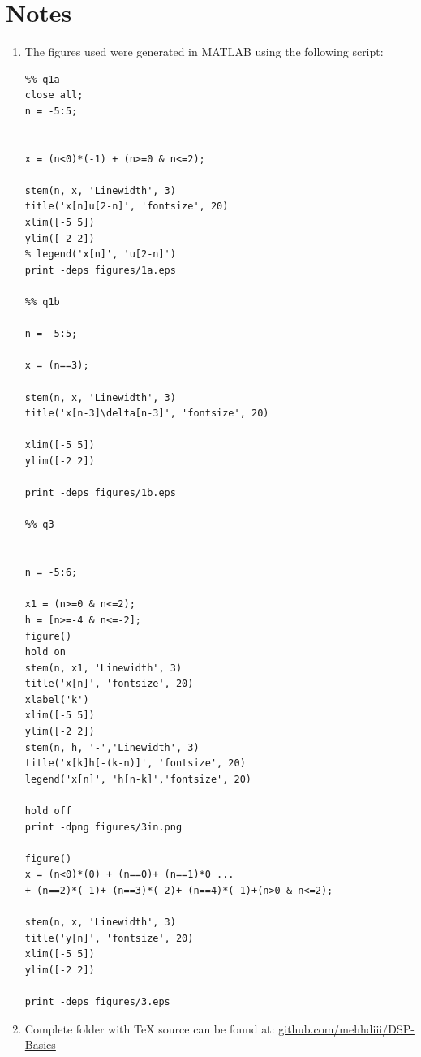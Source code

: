 \documentclass[12pt,letterpaper]{article}
\begin{document}
\section*{Notes}
\begin{enumerate}
    \item The figures used were generated in MATLAB using the following script: 
\begin{lstlisting}
%% q1a
close all; 
n = -5:5;


x = (n<0)*(-1) + (n>=0 & n<=2);

stem(n, x, 'Linewidth', 3)
title('x[n]u[2-n]', 'fontsize', 20)
xlim([-5 5])
ylim([-2 2])
% legend('x[n]', 'u[2-n]')
print -deps figures/1a.eps

%% q1b

n = -5:5;

x = (n==3);

stem(n, x, 'Linewidth', 3)
title('x[n-3]\delta[n-3]', 'fontsize', 20)

xlim([-5 5])
ylim([-2 2])

print -deps figures/1b.eps

%% q3


n = -5:6;

x1 = (n>=0 & n<=2);
h = [n>=-4 & n<=-2]; 
figure()
hold on 
stem(n, x1, 'Linewidth', 3)
title('x[n]', 'fontsize', 20)
xlabel('k')
xlim([-5 5])
ylim([-2 2])
stem(n, h, '-','Linewidth', 3)
title('x[k]h[-(k-n)]', 'fontsize', 20)
legend('x[n]', 'h[n-k]','fontsize', 20)

hold off
print -dpng figures/3in.png

figure()
x = (n<0)*(0) + (n==0)+ (n==1)*0 ...
+ (n==2)*(-1)+ (n==3)*(-2)+ (n==4)*(-1)+(n>0 & n<=2);

stem(n, x, 'Linewidth', 3)
title('y[n]', 'fontsize', 20)
xlim([-5 5])
ylim([-2 2])

print -deps figures/3.eps
\end{lstlisting}
\item 
Complete folder with TeX source can be found at: \href{https://github.com/mehhdiii/DSP-Basics}{github.com/mehhdiii/DSP-Basics} 


\end{enumerate} 
\end{document}
